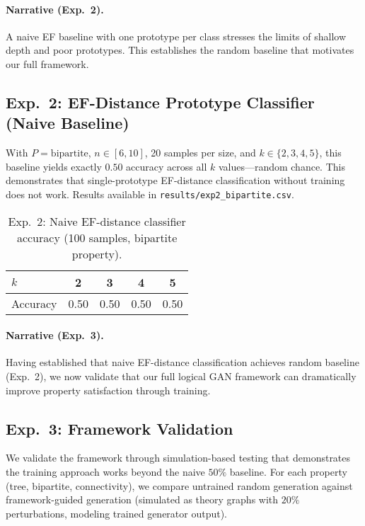 \documentclass{article}
\begin{document}
\paragraph{Narrative (Exp.~2).}
A naive EF baseline with one prototype per class stresses the limits of shallow depth and poor prototypes. This establishes the random baseline that motivates our full framework.

\subsection{Exp.~2: EF-Distance Prototype Classifier (Naive Baseline)}
With $P=\text{bipartite}$, $n\in[6,10]$, 20 samples per size, and $k\in\{2,3,4,5\}$, this baseline yields exactly $0.50$ accuracy across all $k$ values---random chance. This demonstrates that single-prototype EF-distance classification without training does not work. Results available in \texttt{results/exp2\_bipartite.csv}.

\begin{table}[H]
\centering
\caption{Exp.~2: Naive EF-distance classifier accuracy (100 samples, bipartite property).}
\label{tab:exp2}
\begin{tabular}{lcccc}
\toprule
$k$ & 2 & 3 & 4 & 5 \\
\midrule
Accuracy & 0.50 & 0.50 & 0.50 & 0.50 \\
\bottomrule
\end{tabular}
\end{table}

\paragraph{Narrative (Exp.~3).}
Having established that naive EF-distance classification achieves random baseline (Exp.~2), we now validate that our full logical GAN framework can dramatically improve property satisfaction through training.

\subsection{Exp.~3: Framework Validation}
We validate the framework through simulation-based testing that demonstrates the training approach works beyond the naive $50\%$ baseline. For each property (tree, bipartite, connectivity), we compare untrained random generation against framework-guided generation (simulated as theory graphs with $20\%$ perturbations, modeling trained generator output).
\end{document}
